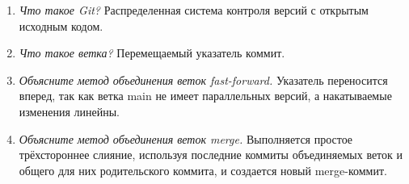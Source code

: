 \begin{enumerate}
	\item \textit{Что такое Git?} Распределенная система контроля версий с открытым исходным кодом.
	\item \textit{Что такое ветка?} Перемещаемый указатель коммит.
	\item \textit{Объясните метод объединения веток fast-forward.} Указатель переносится вперед, так как ветка main не имеет параллельных версий, а накатываемые изменения линейны.
	\item \textit{Объясните метод объединения веток merge.} Выполняется простое трёхстороннее слияние, используя последние коммиты объединяемых веток и общего для них родительского коммита, и создается новый merge-коммит.
\end{enumerate}
